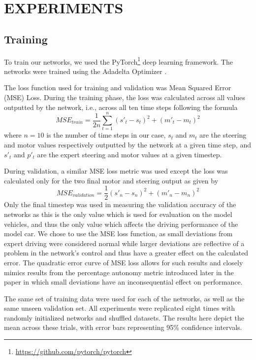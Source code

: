 \addtolength{\textheight}{-10pt}

\section{EXPERIMENTS}
\label{sec:experiments}

\subsection{Training}
To train our networks, we used the PyTorch\footnote{\url{https://github.com/pytorch/pytorch}} deep learning framework. The networks were trained using the Adadelta Optimizer \cite{DBLP:journals/corr/abs-1212-5701}.

The loss function used for training and validation was Mean Squared Error  (MSE) Loss. During the training phase, the loss was calculated across all values outputted by the network, i.e., across all ten time steps following the formula
\begin{equation}
MSE_{train} = \dfrac{1}{2n}\sum_{t=1}^{n}(s'_t -  s_t)^2 +(m'_t - m_t)^2 
\end{equation}
where $n=10$ is the number of time steps in our case, $s_t$  and $m_t$ are the steering and motor values respectively outputted by the network at a given time step, and $s'_t$ and $p'_t$ are the expert steering and motor values at a given timestep.

During validation, a similar MSE loss metric was used except the loss was calculated only for the two final motor and steering output as given by
\begin{equation}
MSE_{validation} = \dfrac{1}{2} (s'_n -  s_n)^2 +(m'_n - m_n)^2
\end{equation}
Only the final timestep was used in measuring the validation accuracy of the networks as this is the only value which is used for evaluation on the model vehicles, and thus the only value which affects the driving performance of the model car. We chose to use the MSE loss function, as small deviations from expert driving were considered normal while larger deviations are reflective of a problem in the network's control and thus have a greater effect on the calculated error. The quadratic error curve of MSE loss allows for such results and closely mimics results from the percentage autonomy metric introduced later in the paper in which small deviations have an inconsequential effect on performance.

The same set of training data were used for each of the networks, as well as the same unseen validation set. All experiments were replicated eight times with randomly initialized networks and shuffled datasets. The results here depict the mean across these trials, with error bars representing 95\% confidence intervals.

